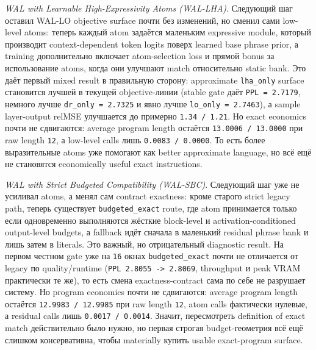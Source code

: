 \begin{itemize}[leftmargin=1.5em]
\emph{WAL with Learnable High-Expressivity Atoms (WAL-LHA)}.
Следующий шаг оставил WAL-LO objective surface почти без изменений, но сменил
сами low-level atoms: теперь каждый atom задаётся маленьким expressive module,
который производит context-dependent token logits поверх learned base phrase
prior, а training дополнительно включает atom-selection loss и прямой bonus за
использование atoms, когда они улучшают match относительно static bank. Это
даёт первый mixed result в правильную сторону: approximate
\texttt{lha\_only} surface становится лучшей в текущей objective-линии
(stable gate даёт \texttt{PPL = 2.7179}, немного лучше
\texttt{dr\_only = 2.7325} и явно лучше \texttt{lo\_only = 2.7463}), а
sample layer-output relMSE улучшается до примерно \texttt{1.34 / 1.21}. Но
exact economics почти не сдвигаются: average program length остаётся
\texttt{13.0006 / 13.0000} при raw length \texttt{12}, а low-level calls лишь
\texttt{0.0083 / 0.0000}. То есть более выразительные atoms уже помогают как
better approximate language, но всё ещё не становятся economically useful exact
instructions.

\emph{WAL with Strict Budgeted Compatibility (WAL-SBC)}.
Следующий шаг уже не усиливал atoms, а менял сам contract exactness: кроме
старого strict legacy path, теперь существует \texttt{budgeted\_exact} route,
где atom принимается только если одновременно выполняются жёсткие block-level и
activation-conditioned output-level budgets, а fallback идёт сначала в маленький
residual phrase bank и лишь затем в literals. Это важный, но отрицательный
diagnostic result. На первом честном gate уже на \texttt{16} окнах
\texttt{budgeted\_exact} почти не отличается от legacy по quality/runtime
(\texttt{PPL 2.8055 -> 2.8069}, throughput и peak VRAM практически те же), то
есть смена exactness-contract сама по себе не разрушает систему. Но program
economics почти не сдвигаются: average program length остаётся
\texttt{12.9983 / 12.9985} при raw length \texttt{12}, atom calls фактически
нулевые, а residual calls лишь \texttt{0.0017 / 0.0014}. Значит, пересмотреть
definition of exact match действительно было нужно, но первая строгая
budget-геометрия всё ещё слишком консервативна, чтобы materially купить usable
exact-program surface.


\end{itemize}
